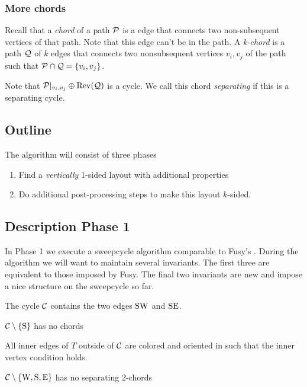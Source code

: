 
  \subsubsection{More chords}
    Recall that a \emph{chord} of a path $\P$ is a edge that connects two non-subsequent vertices of that path. Note that this edge can't be in the path. A \emph{k-chord} is a path $\Q$ of $k$ edges that connects two nonsubsequent vertices $v_i, v_j$ of the path such that $\P \cap \Q = \braces{v_i, v_j}$.

    Note that $\P|_{v_i, v_j} \oplus \rev(\Q)$ is a cycle. We call this chord \emph{separating} if this is a separating cycle. 

\subsection{Outline}
  The algorithm will consist of three phases

  \begin{enumerate}
    \item Find a \emph{vertically} 1-sided layout with additional properties
    \item Do additional post-processing steps to make this layout $k$-sided.
  \end{enumerate}

\subsection{Description Phase 1}
  In Phase 1 we execute a sweepcycle algorithm comparable to Fusy's \cite{Fusy2006}.
  During the algorithm we will want to maintain several invariants. The first three are equivalent to those imposed by Fusy. The final two invariants are new and impose a nice structure on the sweepcycle so far.

  \begin{invariants}
    \itemsep=-4pt

    \item \label{i:uni:SWandSE} The cycle $\C$ contains the two edges $\pS \pW$ and $\pS \pE$.
    \item \label{i:uni:noChords} $\cpath$ has no chords
    \item \label{i:uni:intVertCond} All inner edges of $T$ outside of $\C$ are colored and oriented in such that the inner vertex condition holds. %
    \item \label{i:uni:no2Chords} $\C\sm{\pW, \pS, \pE}$ has no separating 2-chords
  \end{invariants}


